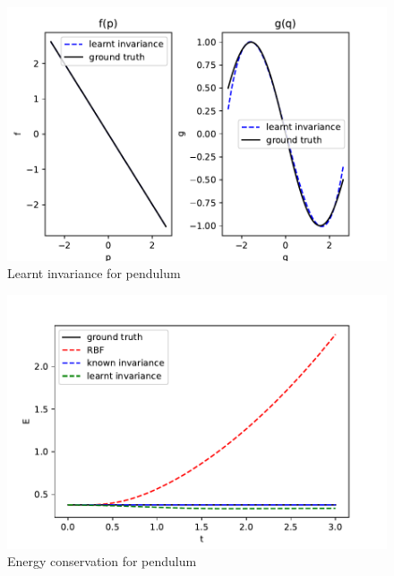\documentclass{statsmsc}
\begin{document}
\begin{figure}[H] 
  \includegraphics[width=0.6\linewidth]{../codes/figures/pendulum_learnt.pdf}
  \centering
  \caption{Learnt invariance for pendulum}
  \label{fig:pendulum_learnt}
\end{figure}

\begin{figure}[H] 
  \includegraphics[width=0.6\linewidth]{../codes/figures/pendulum_energy.pdf}
  \centering
  \caption{Energy conservation for pendulum}
  \label{fig:pendulum_energy}
\end{figure}
\end{document}

